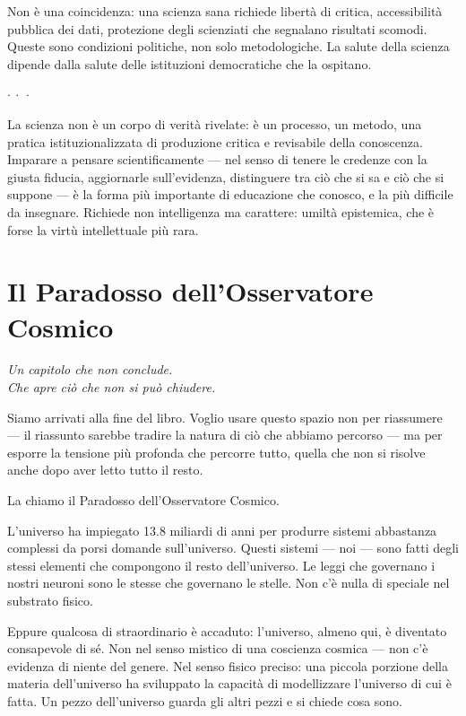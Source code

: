 \documentclass[12pt,a4paper,openany]{book}
\newcommand{\sezione}[1]{\vspace{1.2em}{\large\bfseries #1}\vspace{0.5em}\par}
\newcommand{\puntini}{\begin{center}$\cdot\ \cdot\ \cdot$\end{center}\vspace{0.3em}}
\begin{document}
Non è una coincidenza: una scienza sana richiede libertà di critica, accessibilità pubblica dei dati, protezione degli scienziati che segnalano risultati scomodi. Queste sono condizioni politiche, non solo metodologiche. La salute della scienza dipende dalla salute delle istituzioni democratiche che la ospitano.

\puntini

La scienza non è un corpo di verità rivelate: è un processo, un metodo, una pratica istituzionalizzata di produzione critica e revisabile della conoscenza. Imparare a pensare scientificamente --- nel senso di tenere le credenze con la giusta fiducia, aggiornarle sull'evidenza, distinguere tra ciò che si sa e ciò che si suppone --- è la forma più importante di educazione che conosco, e la più difficile da insegnare. Richiede non intelligenza ma carattere: umiltà epistemica, che è forse la virtù intellettuale più rara.

\chapter{Il Paradosso dell'Osservatore Cosmico}

\begin{center}
\itshape
Un capitolo che non conclude.\\
Che apre ciò che non si può chiudere.
\end{center}

\bigskip

Siamo arrivati alla fine del libro. Voglio usare questo spazio non per riassumere — il riassunto sarebbe tradire la natura di ciò che abbiamo percorso — ma per esporre la tensione più profonda che percorre tutto, quella che non si risolve anche dopo aver letto tutto il resto.

La chiamo il Paradosso dell'Osservatore Cosmico.

\sezione{La formulazione del paradosso}

L'universo ha impiegato 13.8 miliardi di anni per produrre sistemi abbastanza complessi da porsi domande sull'universo. Questi sistemi — noi — sono fatti degli stessi elementi che compongono il resto dell'universo. Le leggi che governano i nostri neuroni sono le stesse che governano le stelle. Non c'è nulla di speciale nel substrato fisico.

Eppure qualcosa di straordinario è accaduto: l'universo, almeno qui, è diventato consapevole di sé. Non nel senso mistico di una coscienza cosmica — non c'è evidenza di niente del genere. Nel senso fisico preciso: una piccola porzione della materia dell'universo ha sviluppato la capacità di modellizzare l'universo di cui è fatta. Un pezzo dell'universo guarda gli altri pezzi e si chiede cosa sono.
\end{document}
